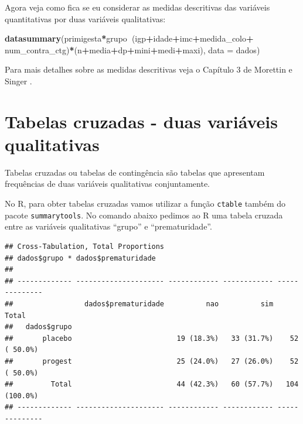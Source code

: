 \documentclass[
]{book}
\newenvironment{Shaded}{\begin{snugshade}}{\end{snugshade}}
\newcommand{\DataTypeTok}[1]{\textcolor[rgb]{0.13,0.29,0.53}{#1}}
\newcommand{\KeywordTok}[1]{\textcolor[rgb]{0.13,0.29,0.53}{\textbf{#1}}}
\newcommand{\NormalTok}[1]{#1}
\newcommand{\OperatorTok}[1]{\textcolor[rgb]{0.81,0.36,0.00}{\textbf{#1}}}
\newcommand{\StringTok}[1]{\textcolor[rgb]{0.31,0.60,0.02}{#1}}
\begin{document}
Agora veja como fica se eu considerar as medidas descritivas das variáveis quantitativas por duas variáveis qualitativas:

\begin{Shaded}
\begin{Highlighting}[]
\KeywordTok{datasummary}\NormalTok{(primigesta}\OperatorTok{*}\NormalTok{grupo}\OperatorTok{~}\NormalTok{(igp}\OperatorTok{+}\NormalTok{idade}\OperatorTok{+}\NormalTok{imc}\OperatorTok{+}\NormalTok{medida_colo}\OperatorTok{+}
\StringTok{  }\NormalTok{num_contra_ctg)}\OperatorTok{*}\NormalTok{(n}\OperatorTok{+}\NormalTok{media}\OperatorTok{+}\NormalTok{dp}\OperatorTok{+}\NormalTok{mini}\OperatorTok{+}\NormalTok{medi}\OperatorTok{+}\NormalTok{maxi), }\DataTypeTok{data =}\NormalTok{ dados)}
\end{Highlighting}
\end{Shaded}

Para mais detalhes sobre as medidas descritivas veja o Capítulo 3 de Morettin e Singer \citep{morettin2020introduccaoa}.

\hypertarget{tabelas-cruzadas---duas-variuxe1veis-qualitativas}{%
\section{Tabelas cruzadas - duas variáveis qualitativas}\label{tabelas-cruzadas---duas-variuxe1veis-qualitativas}}

Tabelas cruzadas ou tabelas de contingência são tabelas que apresentam frequências de duas variáveis qualitativas conjuntamente.

No R, para obter tabelas cruzadas vamos utilizar a função \texttt{ctable} também do pacote \texttt{summarytools}. No comando abaixo pedimos ao R uma tabela cruzada entre as variáveis qualitativas ``grupo'' e ``prematuridade''.

\begin{Shaded}
\end{Shaded}

\begin{verbatim}
## Cross-Tabulation, Total Proportions  
## dados$grupo * dados$prematuridade  
## 
## ------------- --------------------- ------------ ------------ --------------
##                 dados$prematuridade          nao          sim          Total
##   dados$grupo                                                               
##       placebo                         19 (18.3%)   33 (31.7%)    52 ( 50.0%)
##       progest                         25 (24.0%)   27 (26.0%)    52 ( 50.0%)
##         Total                         44 (42.3%)   60 (57.7%)   104 (100.0%)
## ------------- --------------------- ------------ ------------ --------------
\end{verbatim}
\end{document}
